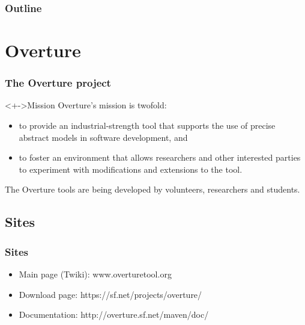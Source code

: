 %
%
\begin{frame}[c]
	\titlepage
\end{frame}

\begin{frame}[c]
  \frametitle{Outline}
  \tableofcontents %
\end{frame}


\section{Overture}
\frame
{
  \frametitle{The Overture project}

\begin{block}<+->{Mission}
	Overture's mission is twofold: 
  \begin{itemize}
  		\item to provide an industrial-strength tool that supports the use of precise abstract models in software development, and 
  		\item to foster an environment that allows researchers and other interested parties to experiment with modifications and extensions to the tool.      

  \end{itemize}
\end{block}

The Overture tools are being developed by volunteers, researchers and students.
}



\subsection{Sites}
\frame
{
  \frametitle{Sites}


\begin{center}
  \begin{itemize}
  		\item Main page (Twiki): www.overturetool.org
  		\item Download page: https://sf.net/projects/overture/
  		\item Documentation: http://overture.sf.net/maven/doc/
  \end{itemize}
\end{center}
}
